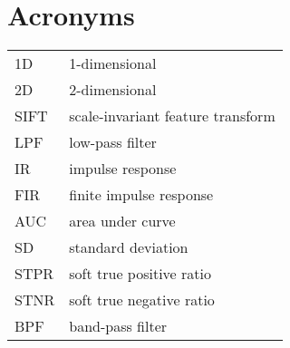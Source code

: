 \section*{Acronyms}
\begin{tabular}{p{} p{}}

    1D & 1-dimensional \\
    2D & 2-dimensional \\
    SIFT & scale-invariant feature transform \\
    LPF & low-pass filter \\
    IR & impulse response \\
    FIR & finite impulse response \\
    AUC & area under curve \\
    SD & standard deviation \\
    STPR & soft true positive ratio \\
    STNR & soft true negative ratio \\
    BPF & band-pass filter \\

\end{tabular}


